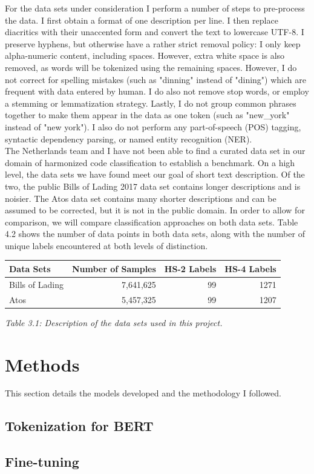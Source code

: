 For the data sets under consideration I perform a number of steps to pre-process the data. I first obtain a format of one description per line. 
I then replace diacritics with their unaccented form and convert the text to lowercase UTF-8. I preserve hyphens, but otherwise have a rather strict removal policy: I only keep alpha-numeric content, including spaces. However, extra white space is also removed, as words will be tokenized using the remaining spaces. However, I do not correct for spelling mistakes (such as "dinning" instead of "dining") which are frequent with data entered by human. I do also not remove stop words, or employ a stemming or lemmatization strategy. 
Lastly, I do not group common phrases together to make them appear in the data as one token (such as "new{\_}york" instead of "new york"). I also do not perform any part-of-speech (POS) tagging, syntactic dependency parsing, or named entity recognition (NER).
\\

The Netherlands team and I have not been able to find a curated data set in our domain of harmonized code classification to establish a benchmark. On a high level, the data sets we have found meet our goal of short text description. Of the two, the public Bills of Lading 2017 data set contains longer descriptions and is noisier. The Atos data set contains many shorter descriptions and can be assumed to be corrected, but it is not in the public domain. In order to allow for comparison, we will compare classification approaches on both data sets. Table 4.2 shows the number of data points in both data sets, along with the number of unique labels encountered at both levels of distinction.

\begin{center}
    \begin{tabular}{lrrr} \hline
Data Sets & Number of Samples & HS-2 Labels & HS-4 Labels\\ \hline
Bills of Lading & 7,641,625 & 99 & 1271\\
Atos & 5,457,325 & 99 & 1207\\ \hline
	\end{tabular}
\end{center}
{\textit{Table 3.1: Description of the data sets used in this project.}} \\

\chapter{Methods}
This section details the models developed and the methodology I followed.
\section{Tokenization for BERT}
\section{Fine-tuning}
